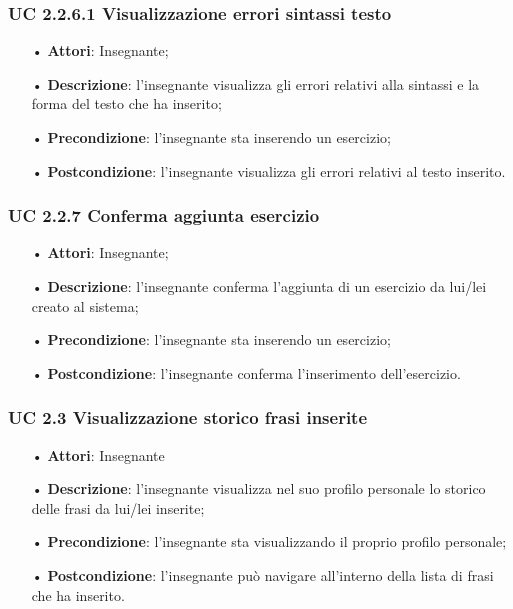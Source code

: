 \subsubsection{UC 2.2.6.1 Visualizzazione errori sintassi testo}
\begin{itemize}
	\item[•] \textbf{Attori}: Insegnante;
	\item[•] \textbf{Descrizione}: l'insegnante visualizza gli errori relativi alla sintassi e la forma del testo che ha inserito;
	\item[•] \textbf{Precondizione}: l'insegnante sta inserendo un esercizio;
	\item[•] \textbf{Postcondizione}: l'insegnante visualizza gli errori relativi al testo inserito.
\end{itemize}


\subsubsection{UC 2.2.7 Conferma aggiunta esercizio}
\begin{itemize}
	\item[•] \textbf{Attori}: Insegnante;
	\item[•] \textbf{Descrizione}: l'insegnante conferma l'aggiunta di un esercizio da lui/lei creato al sistema;
	\item[•] \textbf{Precondizione}: l'insegnante sta inserendo un esercizio;
	\item[•] \textbf{Postcondizione}: l'insegnante conferma l'inserimento dell'esercizio.
\end{itemize}



\subsubsection{UC 2.3 Visualizzazione storico frasi inserite}

\begin{itemize}
	\item[•] \textbf{Attori}: Insegnante	   
	\item[•] \textbf{Descrizione}: l'insegnante visualizza nel suo profilo personale lo storico delle frasi da lui/lei inserite; 
	\item[•] \textbf{Precondizione}: l'insegnante sta visualizzando il proprio profilo personale;
	\item[•] \textbf{Postcondizione}: l'insegnante può navigare all'interno della lista di frasi che ha inserito.
\end{itemize}


